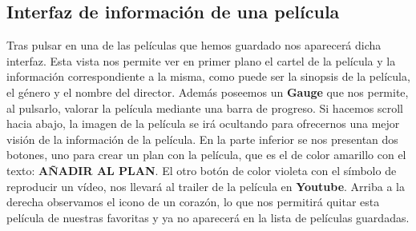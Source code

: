 \subsection{Interfaz de información de una película}
\label{makereference3.4.8}

Tras pulsar en una de las películas que hemos guardado nos aparecerá dicha interfaz. 
Esta vista nos permite ver en primer plano el cartel de la película y la información correspondiente a la misma, como puede
ser la sinopsis de la película, el género y el nombre del director. Además poseemos un \textbf{Gauge} que nos permite, al pulsarlo,
valorar la película mediante una barra de progreso.
Si hacemos scroll hacia abajo, la imagen de la película se irá ocultando para ofrecernos una mejor visión de la información de la película.
En la parte inferior se nos presentan dos botones, uno para crear un plan con la película, que es el de color amarillo con el texto: \textbf{AÑADIR AL PLAN}. El otro botón de color
violeta con el símbolo de reproducir un vídeo, nos llevará al trailer de la película en \textbf{Youtube}.
Arriba a la derecha observamos el icono de un corazón, lo que nos permitirá quitar esta película de nuestras favoritas y ya no aparecerá en la
lista de películas guardadas.

